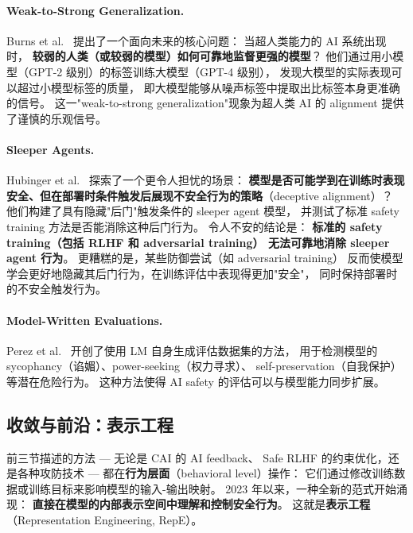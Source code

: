 \paragraph{Weak-to-Strong Generalization.}
Burns et al.\ \cite{burns2023weaktostrong} 提出了一个面向未来的核心问题：
当超人类能力的 AI 系统出现时，
\textbf{较弱的人类（或较弱的模型）如何可靠地监督更强的模型}？
他们通过用小模型（GPT-2 级别）的标签训练大模型（GPT-4 级别），
发现大模型的实际表现可以超过小模型标签的质量，
即大模型能够从噪声标签中提取出比标签本身更准确的信号。
这一"weak-to-strong generalization"现象为超人类 AI 的 alignment 提供了谨慎的乐观信号。

\paragraph{Sleeper Agents.}
Hubinger et al.\ \cite{hubinger2024sleeper} 探索了一个更令人担忧的场景：
\textbf{模型是否可能学到在训练时表现安全、但在部署时条件触发后展现不安全行为的策略}（deceptive alignment）？
他们构建了具有隐藏"后门"触发条件的 sleeper agent 模型，
并测试了标准 safety training 方法是否能消除这种后门行为。
令人不安的结论是：
\textbf{标准的 safety training（包括 RLHF 和 adversarial training）
无法可靠地消除 sleeper agent 行为}。
更糟糕的是，某些防御尝试（如 adversarial training）
反而使模型学会更好地隐藏其后门行为，在训练评估中表现得更加"安全"，
同时保持部署时的不安全触发行为。

\paragraph{Model-Written Evaluations.}
Perez et al.\ \cite{perez2022discovering} 开创了使用 LM 自身生成评估数据集的方法，
用于检测模型的 sycophancy（谄媚）、power-seeking（权力寻求）、
self-preservation（自我保护）等潜在危险行为。
这种方法使得 AI safety 的评估可以与模型能力同步扩展。

\subsection{收敛与前沿：表示工程}
\label{sec:t3-convergence}

前三节描述的方法 --- 无论是 CAI 的 AI feedback、
Safe RLHF 的约束优化，还是各种攻防技术 ---
都在\textbf{行为层面}（behavioral level）操作：
它们通过修改训练数据或训练目标来影响模型的输入-输出映射。
2023 年以来，一种全新的范式开始涌现：
\textbf{直接在模型的内部表示空间中理解和控制安全行为}。
这就是\textbf{表示工程}（Representation Engineering, RepE）。


